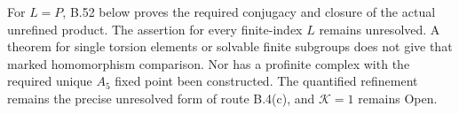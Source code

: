For $L=P$, B.52 below proves the required conjugacy
and closure of the actual unrefined product.
The assertion for every finite-index $L$ remains unresolved.
A theorem for single torsion elements or solvable finite
subgroups does not give that marked homomorphism comparison.
Nor has a profinite complex with the required unique
$A_5$ fixed point been constructed.
The quantified refinement remains the precise unresolved
form of route B.4(c), and $\mathcal K=1$ remains Open.
